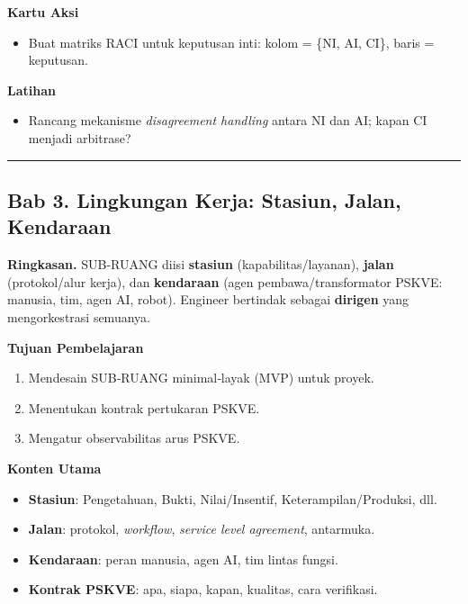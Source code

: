 \documentclass[
  letterpaper,
  DIV=11,
  numbers=noendperiod]{scrartcl}
\providecommand{\tightlist}{%
  \setlength{\itemsep}{0pt}\setlength{\parskip}{0pt}}
\begin{document}
\textbf{Kartu Aksi}

\begin{itemize}
\tightlist
\item
  Buat matriks RACI untuk keputusan inti: kolom = \{NI, AI, CI\}, baris
  = keputusan.
\end{itemize}

\textbf{Latihan}

\begin{itemize}
\tightlist
\item
  Rancang mekanisme \emph{disagreement handling} antara NI dan AI; kapan
  CI menjadi arbitrase?
\end{itemize}

\begin{center}\rule{0.5\linewidth}{0.5pt}\end{center}

\subsection{Bab 3. Lingkungan Kerja: Stasiun, Jalan,
Kendaraan}\label{bab-3.-lingkungan-kerja-stasiun-jalan-kendaraan}

\textbf{Ringkasan.} SUB‑RUANG diisi \textbf{stasiun}
(kapabilitas/layanan), \textbf{jalan} (protokol/alur kerja), dan
\textbf{kendaraan} (agen pembawa/transformator PSKVE: manusia, tim, agen
AI, robot). Engineer bertindak sebagai \textbf{dirigen} yang
mengorkestrasi semuanya.

\textbf{Tujuan Pembelajaran}

\begin{enumerate}
\def\labelenumi{\arabic{enumi}.}
\tightlist
\item
  Mendesain SUB‑RUANG minimal‑layak (MVP) untuk proyek.
\item
  Menentukan kontrak pertukaran PSKVE.
\item
  Mengatur observabilitas arus PSKVE.
\end{enumerate}

\textbf{Konten Utama}

\begin{itemize}
\tightlist
\item
  \textbf{Stasiun}: Pengetahuan, Bukti, Nilai/Insentif,
  Keterampilan/Produksi, dll.
\item
  \textbf{Jalan}: protokol, \emph{workflow}, \emph{service level
  agreement}, antarmuka.
\item
  \textbf{Kendaraan}: peran manusia, agen AI, tim lintas fungsi.
\item
  \textbf{Kontrak PSKVE}: apa, siapa, kapan, kualitas, cara verifikasi.
\end{itemize}
\end{document}
